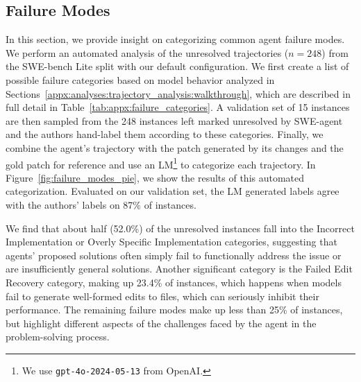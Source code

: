 \subsection{Failure Modes}
\label{appx:analyses:failure_modes}
In this section, we provide insight on categorizing common agent failure modes.
We perform an automated analysis of the unresolved trajectories ($n=248$) from the SWE-bench Lite split with our default configuration.
We first create a list of possible failure categories based on model behavior analyzed in Sections~\ref{appx:analyses:trajectory_analysis:walkthrough}, which are described in full detail in Table~\ref{tab:appx:failure_categories}.
A validation set of \num{15} instances are then sampled from the \num{248} instances left marked unresolved by SWE-agent and the authors hand-label them according to these categories.
Finally, we combine the agent's trajectory with the patch generated by its changes and the gold patch for reference and use an LM\footnote{We use \texttt{gpt-4o-2024-05-13} from OpenAI.} to categorize each trajectory.
In Figure~\ref{fig:failure_modes_pie}, we show the results of this automated categorization.
Evaluated on our validation set, the LM generated labels agree with the authors' labels on \num{87}\% of instances.

We find that about half (\num{52.0}\%) of the unresolved instances fall into the Incorrect Implementation or Overly Specific Implementation categories, suggesting that agents' proposed solutions often simply fail to functionally address the issue or are insufficiently general solutions.
Another significant category is the Failed Edit Recovery category, making up \num{23.4}\% of instances, which happens when models fail to generate well-formed edits to files, which can seriously inhibit their performance.
The remaining failure modes make up less than \num{25}\% of instances, but highlight different aspects of the challenges faced by the agent in the problem-solving process.


